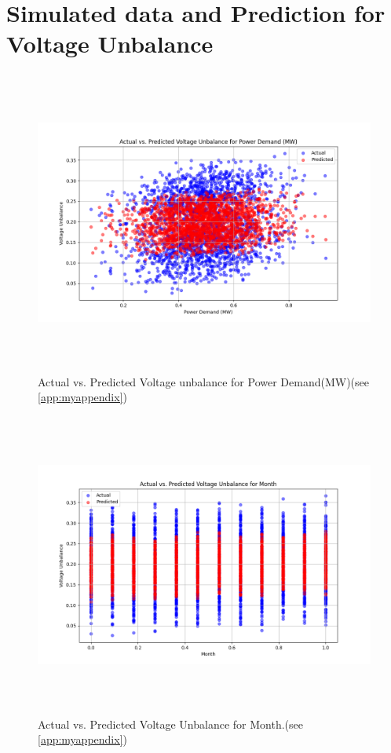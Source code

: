 \documentclass[a4paper,12pt,oneside]{book}
\begin{document}
  \section{Simulated data and Prediction for Voltage Unbalance}
  \begin{figure}[h!]
    \centering
    \includegraphics[height=10cm]{Figures/predicted_data/Actual vs. Predicted Voltage Unbalance for Power Demand (MW).png} 
    \caption{Actual vs. Predicted Voltage unbalance for Power Demand(MW)(see \autoref{app:myappendix})}
    \label{fig:voltage-drops}
  \end{figure}

  
  \begin{figure}[h!]
    \centering
    \includegraphics[height=10cm]{Figures/predicted_data/Actual vs. Predicted Voltage Unbalance for Month.png} 
    \caption{Actual vs. Predicted Voltage Unbalance for Month.(see \autoref{app:myappendix})}
    \label{fig:voltage-drops}
  \end{figure}
\end{document}
